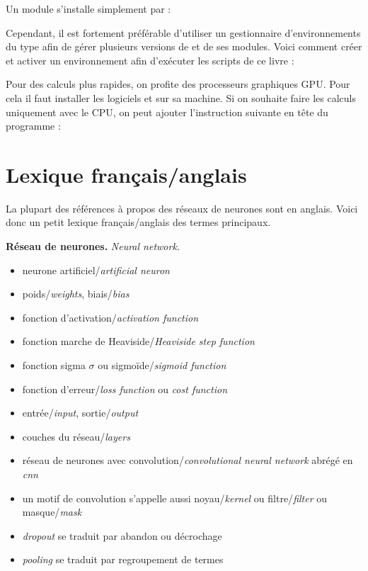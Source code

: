 \documentclass[11pt,class=report,crop=false]{standalone}
\begin{document}
Un module s'installe simplement par :

Cependant, il est fortement préférable d'utiliser un gestionnaire d'environnements du type  afin de gérer plusieurs versions de \Python{} et de ses modules.
Voici comment créer et activer un environnement  afin d’exécuter les scripts de ce livre :

\smallskip



\medskip

Pour des calculs plus rapides, on profite des processeurs graphiques GPU. Pour cela il faut installer les logiciels  et  sur sa machine. Si on souhaite faire les calculs uniquement avec le CPU, on peut ajouter l'instruction suivante en tête du programme : 


\section{Lexique français/anglais}

La plupart des références à propos des réseaux de neurones sont en anglais. Voici donc un petit lexique français/anglais des termes principaux.

\textbf{Réseau de neurones.} \emph{Neural network.}

\begin{itemize}
  \item neurone artificiel/\emph{artificial neuron}
  \item poids/\emph{weights}, biais/\emph{bias}
  \item fonction d'activation/\emph{activation function}
  \item fonction marche de Heaviside/\emph{Heaviside step function}
  \item fonction sigma $\sigma$ ou sigmoïde/\emph{sigmoid function}
  \item fonction d'erreur/\emph{loss function} ou \emph{cost function}
  \item entrée/\emph{input}, sortie/\emph{output}
  \item couches du réseau/\emph{layers}
  \item réseau de neurones avec convolution/\emph{convolutional neural network} abrégé en \emph{cnn}
  \item un motif de convolution s'appelle aussi noyau/\emph{kernel} ou filtre/\emph{filter}
 ou masque/\emph{mask}
  \item \emph{dropout} se traduit par abandon ou décrochage
  \item \emph{pooling} se traduit par regroupement de termes
\end{itemize} 
 
\end{document}
